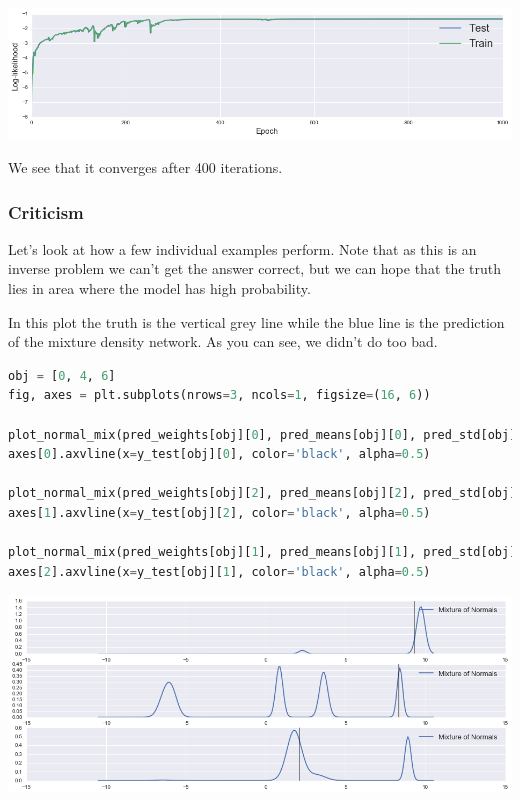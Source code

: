 \includegraphics[width=700px]{images/mdn-fig1.png}

We see that it converges after 400 iterations.

\subsubsection{Criticism}

Let's look at how a few individual examples perform. Note that as this
is an inverse problem we can't get the answer correct, but we can hope
that the truth lies in area where the model has high probability.

In this plot the truth is the vertical grey line while the blue line is the prediction of the mixture density network. As you can see, we didn't do too bad.

\begin{lstlisting}[language=Python]
obj = [0, 4, 6]
fig, axes = plt.subplots(nrows=3, ncols=1, figsize=(16, 6))

plot_normal_mix(pred_weights[obj][0], pred_means[obj][0], pred_std[obj][0], axes[0], comp=False)
axes[0].axvline(x=y_test[obj][0], color='black', alpha=0.5)

plot_normal_mix(pred_weights[obj][2], pred_means[obj][2], pred_std[obj][2], axes[1], comp=False)
axes[1].axvline(x=y_test[obj][2], color='black', alpha=0.5)

plot_normal_mix(pred_weights[obj][1], pred_means[obj][1], pred_std[obj][1], axes[2], comp=False)
axes[2].axvline(x=y_test[obj][1], color='black', alpha=0.5)
\end{lstlisting}

\includegraphics[width=700px]{images/mdn-fig2.png}

